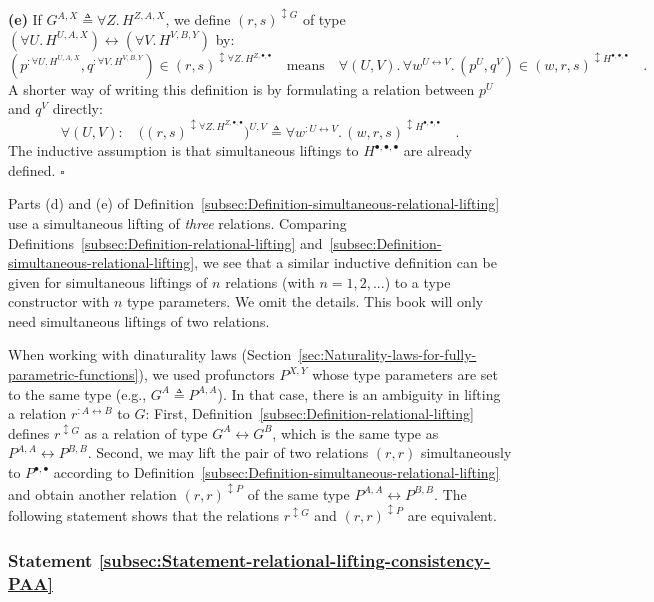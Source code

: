 \textbf{(e)} If $G^{A,X}\triangleq\forall Z.\,H^{Z,A,X}$, we define
$(r,s)^{\updownarrow G}$ of type $(\forall U.\,H^{U,A,X})\leftrightarrow(\forall V.\,H^{V,B,Y})$
by:
\[
(p^{:\forall U.\,H^{U,A,X}},q^{:\forall V.\,H^{V,B,Y}})\in(r,s)^{\updownarrow\forall Z.\,H^{Z,\bullet,\bullet}}\quad\text{means}\quad\forall(U,V).\,\forall w^{U\leftrightarrow V}.\,(p^{U},q^{V})\in(w,r,s)^{\updownarrow H^{\bullet,\bullet,\bullet}}\quad.
\]
A shorter way of writing this definition is by formulating a relation
between $p^{U}$ and $q^{V}$ directly:
\begin{equation}
\forall(U,V):\quad\big((r,s)^{\updownarrow\forall Z.\,H^{Z,\bullet,\bullet}}\big)^{U,V}\triangleq\forall w^{:U\leftrightarrow V}.\,(w,r,s)^{\updownarrow H^{\bullet,\bullet,\bullet}}\quad.\label{eq:relational-lifting-quantified-types-short-1}
\end{equation}
The inductive assumption is that simultaneous liftings to $H^{\bullet,\bullet,\bullet}$
are already defined. $\square$

Parts (d) and (e) of Definition~\ref{subsec:Definition-simultaneous-relational-lifting}
use a simultaneous lifting of \emph{three} relations. Comparing Definitions~\ref{subsec:Definition-relational-lifting}
and~\ref{subsec:Definition-simultaneous-relational-lifting}, we
see that a similar inductive definition can be given for simultaneous
liftings of $n$ relations (with $n=1,2,...$) to a type constructor
with $n$ type parameters. We omit the details. This book will only
need simultaneous liftings of two relations.

When working with dinaturality laws (Section~\ref{sec:Naturality-laws-for-fully-parametric-functions}),
we used profunctors $P^{X,Y}$ whose type parameters are set to the
same type (e.g., $G^{A}\triangleq P^{A,A}$). In that case, there
is an ambiguity in lifting a relation $r^{:A\leftrightarrow B}$ to
$G$: First, Definition~\ref{subsec:Definition-relational-lifting}
defines $r^{\updownarrow G}$ as a relation of type $G^{A}\leftrightarrow G^{B}$,
which is the same type as $P^{A,A}\leftrightarrow P^{B,B}$. Second,
we may lift the pair of two relations $\left(r,r\right)$ simultaneously
to $P^{\bullet,\bullet}$ according to Definition~\ref{subsec:Definition-simultaneous-relational-lifting}
and obtain another relation $\left(r,r\right)^{\updownarrow P}$ of
the same type $P^{A,A}\leftrightarrow P^{B,B}$. The following statement
shows that the relations $r^{\updownarrow G}$ and $(r,r)^{\updownarrow P}$
are equivalent.

\subsubsection{Statement \label{subsec:Statement-relational-lifting-consistency-PAA}\ref{subsec:Statement-relational-lifting-consistency-PAA}}

